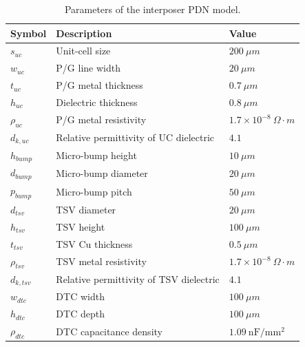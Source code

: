 \begin{table}[t]
\centering
\caption{Parameters of the interposer PDN model.}
\label{tab:model_params}
\setlength{\tabcolsep}{5pt}
\small
\renewcommand{\arraystretch}{1.1}
\begin{tabular}{l l l}
\hline
\textbf{Symbol} & \textbf{Description} & \textbf{Value} \\
\hline
$s_{uc}$   & Unit-cell size & $200~\mu m$ \\
$w_{uc}$   & P/G line width & $20~\mu m$ \\
$t_{uc}$   & P/G metal thickness & $0.7~\mu m$ \\
$h_{uc}$   & Dielectric thickness & $0.8~\mu m$ \\
$\rho_{uc}$ & P/G metal resistivity & $1.7\times10^{-8}~\Omega\cdot m$ \\
$d_{k,uc}$ & Relative permittivity of UC dielectric & $4.1$ \\
\hline
$h_{bump}$ & Micro-bump height & $10~\mu m$ \\
$d_{bump}$ & Micro-bump diameter & $20~\mu m$ \\
$p_{bump}$ & Micro-bump pitch & $50~\mu m$ \\
\hline
$d_{tsv}$   & TSV diameter & $20~\mu m$ \\
$h_{tsv}$   & TSV height & $100~\mu m$ \\
$t_{tsv}$   & TSV Cu thickness & $0.5~\mu m$ \\
$\rho_{tsv}$ & TSV metal resistivity & $1.7\times10^{-8}~\Omega\cdot m$ \\
$d_{k,tsv}$ & Relative permittivity of TSV dielectric & $4.1$ \\
\hline
$w_{dtc}$   & DTC width & $100~\mu m$ \\
$h_{dtc}$   & DTC depth & $100~\mu m$ \\
$\rho_{dtc}$ & DTC capacitance density & $1.09~\mathrm{nF/mm^2}$ \\
\hline
\end{tabular}
\end{table}
